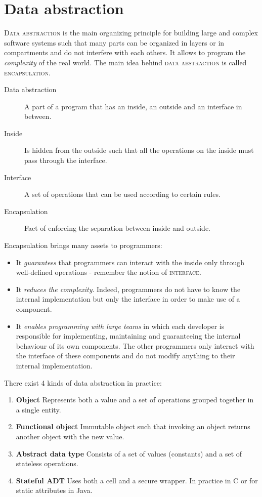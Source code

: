 \documentclass[11pt,a4paper,twoside,openright]{report}
\begin{document}
\section{Data abstraction}

\textsc{Data abstraction} is the main organizing principle for building large 
and complex software systems such that many parts can be organized in layers or 
in compartments and do not interfere with each others. It allows to program the 
\textit{complexity} of the real world. The main idea behind \textsc{data 
abstraction} is called \textsc{encapsulation}.

\begin{description}
 \item[Data abstraction] A part of a program that has an inside, an outside and 
an interface in between.
 \item[Inside] Is hidden from the outside such that all the operations on the 
inside must pass through the interface.
 \item[Interface] A set of operations that can be used according to certain 
rules.
 \item[Encapsulation] Fact of enforcing the separation between inside and 
outside.
\end{description}

Encapsulation brings many assets to programmers:

\begin{itemize}
	\item It \textit{guarantees} that programmers can interact with the 
inside only through well-defined operations - remember the notion of 
\textsc{interface}.
	\item It \textit{reduces the complexity}. Indeed, programmers do not 
have to know the internal implementation but only the interface in order to 
make 
use of a component.
	\item It \textit{enables programming with large teams} in which each 
developer is responsible for implementing, maintaining and guaranteeing the 
internal behaviour of its own components. The other programmers only interact 
with the interface of these components and do not modify anything to their 
internal implementation.
\end{itemize}

There exist 4 kinds of data abstraction in practice:

\begin{enumerate}
 \item \textbf{Object} Represents both a value and a set of operations grouped 
together in a single entity.
 \item \textbf{Functional object} Immutable object such that invoking an object 
returns another object with the new value.
 \item \textbf{Abstract data type} Consists of a set of values (constants) and 
a set of stateless operations.
 \item \textbf{Stateful ADT} Uses both a cell and a secure wrapper. In practice 
in C or for static attributes in Java.
\end{enumerate}
\end{document}
